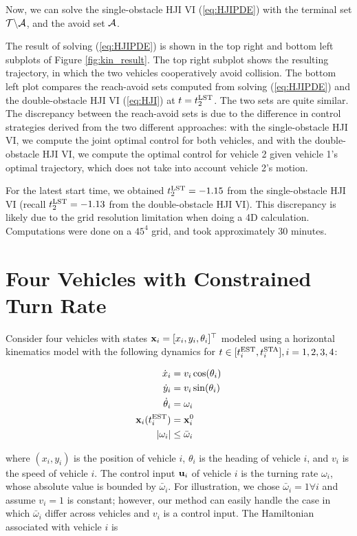 \documentclass[letterpaper, 10pt, conference]{ieeeconf}      %
\begin{document}
Now, we can solve the single-obstacle HJI VI (\ref{eq:HJIPDE}) with the terminal set  $\mathcal{T}\backslash\mathcal{A}$, and the avoid set $\mathcal{A}$.

The result of solving (\ref{eq:HJIPDE}) is shown in the top right and bottom left subplots of Figure \ref{fig:kin_result}. The top right subplot shows the resulting trajectory, in which the two vehicles cooperatively avoid collision. The bottom left plot compares the reach-avoid sets computed from solving (\ref{eq:HJIPDE}) and the double-obstacle HJI VI (\ref{eq:HJI}) at $t=t^{\text{LST}}_2$. The two sets are quite similar. The discrepancy between the reach-avoid sets is due to the difference in control strategies derived from the two different approaches: with the single-obstacle HJI VI, we compute the joint optimal control for both vehicles, and with the double-obstacle HJI VI, we compute the optimal control for vehicle 2 given vehicle 1's optimal trajectory, which does not take into account vehicle 2's motion. 

For the latest start time, we obtained $t^{\text{LST}}_2 = -1.15$ from the single-obstacle HJI VI (recall $t^{\text{LST}}_2=-1.13$ from the double-obstacle HJI VI). This discrepancy is likely due to the grid resolution limitation when doing a 4D calculation. Computations were done on a $45^4$ grid, and took approximately 30 minutes.

\section{Four Vehicles with Constrained Turn Rate}
Consider four vehicles with states $\mathbf{x}_i = [x_i, y_i, \theta_i]^\top$ modeled using a horizontal kinematics model with the following dynamics for $t \in[t^{\text{EST}}_i, t^{\text{STA}}_i],i=1,2,3,4$:

\begin{equation}
\begin{aligned}
\dot{x}_i &= v_i \cos(\theta_i) \\
\dot{y}_i &= v_i \sin(\theta_i) \\
\dot{\theta}_i &= \omega_i \\
\mathbf{x}_i(t^{\text{EST}}_i) &= \mathbf{x}_i^0 \\
|\omega_i| &\le \bar{\omega}_i \\
\end{aligned}
\end{equation}

\noindent where $(x_i, y_i)$ is the position of vehicle $i$, $\theta_i$ is the heading of vehicle $i$, and $v_i$ is the speed of vehicle $i$. The control input $\mathbf{u}_i$ of vehicle $i$ is the turning rate $\omega_i$, whose absolute value is bounded by $\bar{\omega}_i$. For illustration, we chose $\bar{\omega}_i=1 \forall i$ and assume $v_i=1$ is constant; however, our method can easily handle the case in which $\bar{\omega}_i$ differ across vehicles and $v_i$ is a control input. The Hamiltonian associated with vehicle $i$ is
\end{document}
